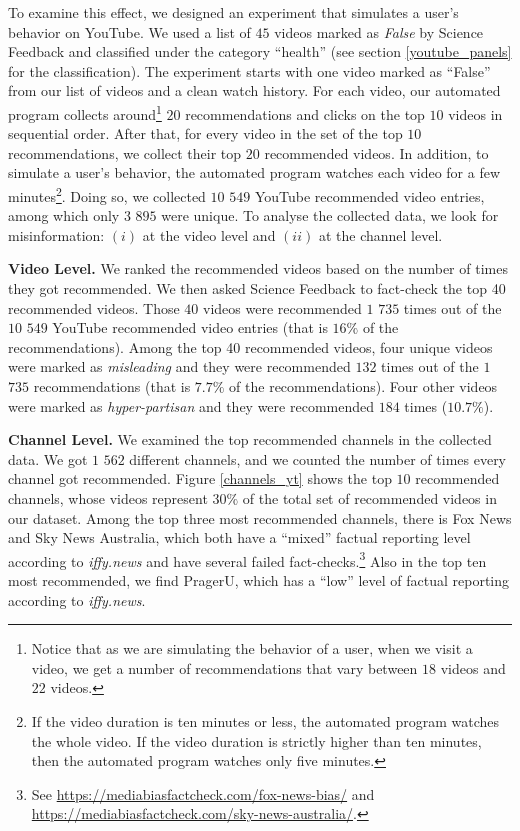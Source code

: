 \documentclass{article}
\begin{document}
To examine this effect, we designed an experiment that simulates a user's behavior on YouTube. We used a list of $45$ videos marked as {\it False} by Science Feedback and classified under the category ``health'' (see section \ref{youtube_panels} for the classification). The experiment starts with one video marked as ``False'' from our list of videos and a clean watch history. For each video, our automated program collects around\footnote{Notice that as we are simulating the behavior of a user, when we visit a video, we get a number of recommendations that vary between $18$ videos and $22$ videos.} $20$ recommendations and clicks on the top $10$ videos in sequential order. After that, for every video in the set of the top $10$ recommendations, we collect their top $20$ recommended videos. In addition, to simulate a user's behavior, the automated program watches each video for a few minutes\footnote{If the video duration is ten minutes or less, the automated program watches the whole video. If the video duration is strictly higher than ten minutes, then the automated program watches only five minutes.}. Doing so, we collected $10$ $549$ YouTube recommended video entries, among which only $3$ $895$ were unique. 
To analyse the collected data, we look for misinformation: $(i)$ at the video level and $(ii)$ at the channel level. 

\smallskip

{\bf Video Level.} We ranked the recommended videos based on the number of times they got recommended. We then asked Science Feedback to fact-check the top 40 recommended videos.
Those $40$ videos were recommended $1$ $735$ times out of the $10$ $549$ YouTube recommended video entries (that is $16\%$ of the recommendations).
Among the top 40 recommended videos, four unique videos were marked as {\it misleading} and they were recommended $132$ times out of the $1$ $735$ recommendations (that is $7.7\%$ of the recommendations).
Four other videos were marked as {\it hyper-partisan} and they were recommended $184$ times ($10.7\%$).

\smallskip 

{\bf Channel Level.} We examined the top recommended channels in the collected data. We got $1$ $562$ different channels, and we counted the number of times every channel got recommended. Figure \ref{channels_yt} shows the top $10$ recommended channels, whose videos represent $30\%$ of the total set of recommended videos in our dataset. Among the top three most recommended channels, there is Fox News and Sky News Australia, which both have a ``mixed'' factual reporting level according to {\it iffy.news} and have several failed fact-checks.\footnote{See \href{https://mediabiasfactcheck.com/fox-news-bias/}{https://mediabiasfactcheck.com/fox-news-bias/} and \href{https://mediabiasfactcheck.com/sky-news-australia/}{https://mediabiasfactcheck.com/sky-news-australia/}.} Also in the top ten most recommended, we find PragerU, which has a ``low'' level of factual reporting according to {\it iffy.news}. 
\end{document}
